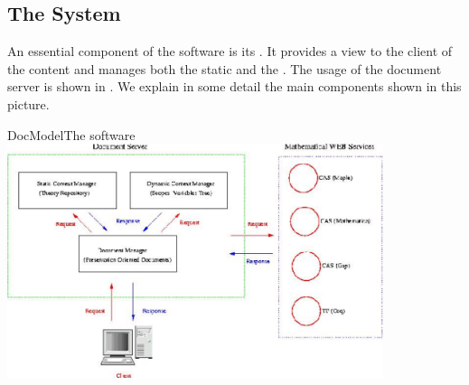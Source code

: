 \subsection{The {\MathDox} System}\label{subsec:cont_theory:mathdox}

An essential component of the {\MathDox} software is its {}. It
provides a view to the client of the content and manages both the
static and the {}.  The usage of the
{\MathDox} document server is shown in {}. We explain in some detail
the main components shown in this picture.


\begin{myfig}{DocModel}{The {\MathDox} software}
  \includegraphics[width=11cm]{projects/mathdox/DocModel}
\end{myfig}

